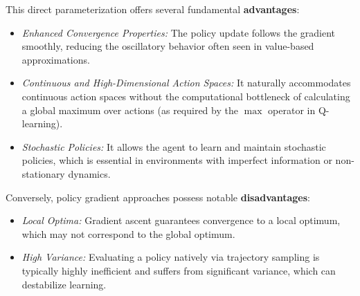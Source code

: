 \documentclass[a4paper]{scrartcl}
\begin{document}
This direct parameterization offers several fundamental \textbf{advantages}:
\begin{itemize}
    \item \textit{Enhanced Convergence Properties:} The policy update follows the gradient smoothly, reducing the oscillatory behavior often seen in value-based approximations.
    \item \textit{Continuous and High-Dimensional Action Spaces:} It naturally accommodates continuous action spaces without the computational bottleneck of calculating a global maximum over actions (as required by the $\max$ operator in Q-learning).
    \item \textit{Stochastic Policies:} It allows the agent to learn and maintain stochastic policies, which is essential in environments with imperfect information or non-stationary dynamics.
\end{itemize} 
Conversely, policy gradient approaches possess notable \textbf{disadvantages}:
\begin{itemize}
    \item \textit{Local Optima:} Gradient ascent guarantees convergence to a local optimum, which may not correspond to the global optimum.
    \item \textit{High Variance:} Evaluating a policy natively via trajectory sampling is typically highly inefficient and suffers from significant variance, which can destabilize learning.
\end{itemize}
\end{document}
